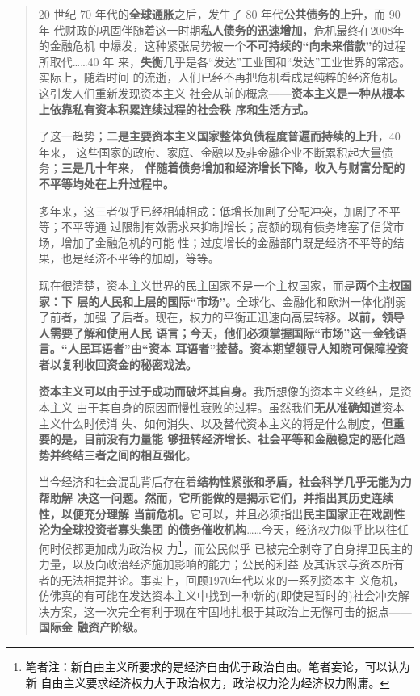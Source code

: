 \begin{quotation}
  20 世纪 70 年代的\textbf{全球通胀}之后，发生了 80 年代\textbf{公共债务的上升}，而 90 年
  代财政的巩固伴随着这一时期\textbf{私人债务的迅速增加}，危机最终在2008年的金融危机
  中爆发，这种紧张局势被一个\textbf{不可持续的“向未来借款”}的过程所取代……40 年
  来，\textbf{失衡}几乎是各“发达”工业国和“发达”工业世界的常态。实际上，随着时间
  的流逝，人们已经不再把危机看成是纯粹的经济危机。这引发人们重新发现资本主义
  社会从前的概念——\textbf{资本主义是一种从根本上依靠私有资本积累连续过程的社会秩
    序和生活方式。}

  了这一趋势；\textbf{二是主要资本主义国家整体负债程度普遍而持续的上升}，40 年来，
  这些国家的政府、家庭、金融以及非金融企业不断累积起大量债务；\textbf{三是几十年来，
    伴随着债务增加和经济增长下降，收入与财富分配的不平等均处在上升过程中。}

  多年来，这三者似乎已经相辅相成：低增长加剧了分配冲突，加剧了不平等；不平等通
  过限制有效需求来抑制增长；高额的现有债务堵塞了信贷市场，增加了金融危机的可能
  性；过度增长的金融部门既是经济不平等的结果，也是经济不平等的加剧，等等。

  现在很清楚，资本主义世界的民主国家不是一个主权国家，而是\textbf{两个主权国家：下
    层的人民和上层的国际“市场”。}全球化、金融化和欧洲一体化削弱了前者，加强
  了后者。现在，权力的平衡正迅速向高层转移。\textbf{以前，领导人需要了解和使用人民
    语言；今天，他们必须掌握国际“市场”这一金钱语言。“人民耳语者”由“资本
    耳语者”接替。资本期望领导人知晓可保障投资者以复利收回资金的秘密戏法。}

  \textbf{资本主义可以由于过于成功而破坏其自身。}我所想像的资本主义终结，是资本主义
  由于其自身的原因而慢性衰败的过程。虽然我们\textbf{无从准确知道}资本主义什么时候消
  失、如何消失、以及替代资本主义的将是什么制度，\textbf{但重要的是，目前没有力量能
    够扭转经济增长、社会平等和金融稳定的恶化趋势并终结三者之间的相互强化}。

  当今经济和社会混乱背后存在着\textbf{结构性紧张和矛盾，社会科学几乎无能为力帮助解
    决这一问题。然而，它所能做的是揭示它们，并指出其历史连续性，以便充分理解
    当前危机。}它可以，并且必须指出\textbf{民主国家正在戏剧性沦为全球投资者寡头集团
    的债务催收机构}……今天，经济权力似乎比以往任何时候都更加成为政治权
  力\footnote{笔者注：新自由主义所要求的是经济自由优于政治自由。笔者妄论，可以认为新
    自由主义要求经济权力大于政治权力，政治权力沦为经济权力附庸。}，而公民似乎
  已被完全剥夺了自身捍卫民主的力量，以及向政治经济施加影响的能力；公民的利益
  及其诉求与资本所有者的无法相提并论。事实上，回顾1970年代以来的一系列资本主
  义危机，仿佛真的有可能在发达资本主义中找到一种新的(即使是暂时的)社会冲突解
  决方案，这一次完全有利于现在牢固地扎根于其政治上无懈可击的据点——\textbf{国际金
    融资产阶级}。


\end{quotation}
